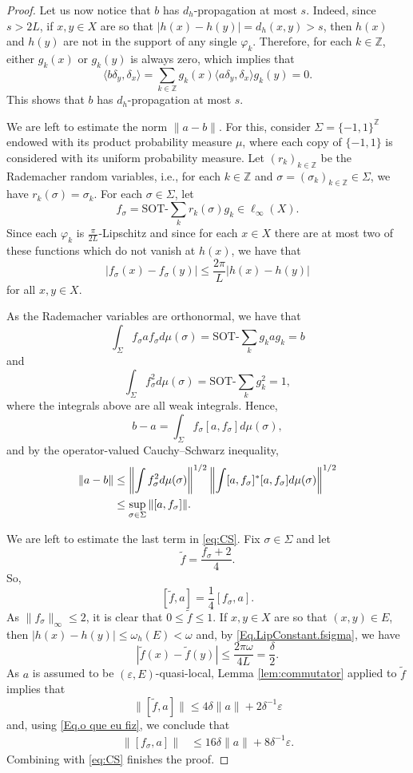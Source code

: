 \documentclass[11pt]{amsart}
\newcommand{\Z}{\mathbb{Z}}
\newcommand{\eps}{\varepsilon}
\newcommand{\SOTh}{\mathrm{SOT}\text{-}}
\numberwithin{equation}{section}
\theoremstyle{definition}
\theoremstyle{remark}
\begin{document}
\begin{proof}
Let us now notice that $b$  has $d_h$-propagation at most $s$. Indeed, since $s>2L$, if $x,y\in X$ are so that $|h(x)-h(y)|=d_h(x,y)> s$, then $h(x)$ and $h(y)$ are not in the support of any single $\varphi_k$.  Therefore, for each $k\in\Z$, either $g_k(x)$ or $g_k(y)$ is always zero, which implies that
\[\langle b\delta_y,\delta_x\rangle=\sum_{k\in\Z} g_k(x)\langle a\delta_y,\delta_x\rangle g_{k}(y)=0 .\]
This shows that $b$  has $d_h$-propagation at most $s$.


We are left to estimate the norm $\|a-b\|$. For this, consider $\Sigma=\{-1,1\}^{\Z}$ endowed with its  product probability measure $\mu$, where each copy of $\{-1,1\}$ is considered with its uniform probability measure.  Let $(r_k)_{k\in \Z}$ be the Rademacher random variables, i.e., for each $k\in\Z$ and $\sigma=(\sigma_k)_{k\in\Z}\in \Sigma$, we have  $r_k(\sigma)=\sigma_k$. For each $\sigma\in \Sigma$, let \[f_{\sigma}=\SOTh\sum_kr_k(\sigma)g_k\in\ell_\infty(X).\] Since each $\varphi_k$ is $\tfrac{\pi}{2L}$-Lipschitz and since for each $x\in X$ there are at most two of these functions which do not vanish at $h(x)$, we have that
\begin{equation}\label{Eq.LipConstant.fsigma}
|f_{\sigma}(x)-f_{\sigma}(y)|\le\frac{2\pi}{L}|h(x)-h(y)|
\end{equation}
for all $x,y\in X$.

As the Rademacher variables are orthonormal, we have that
\[\int_{\Sigma}f_\sigma af_\sigma d\mu(\sigma)=\SOTh\sum_kg_kag_k=b\]
and
\[\int_{\Sigma}f_\sigma^2d\mu(\sigma)=\SOTh\sum_kg_k^2=1,\]
where the integrals above are all weak integrals. Hence,
\[
b-a=\int_\Sigma f_{\sigma}[a,f_{\sigma}]d\mu(\sigma) ,
\]
and by the operator-valued Cauchy--Schwarz inequality,
\begin{align}\label{eq:CS}
\|a-b\|& \leq\left\|\int f_{\sigma}^2 d\mu(\sigma)\right\|^{1/2}\left\|\int[a,f_{\sigma}]^*[a,f_{\sigma}] d\mu(\sigma)\right\|^{1/2}\notag\\
&\le\sup_{\sigma\in\Sigma}\|[a,f_{\sigma}]\|.
\end{align}

We are left to  estimate the last term in \eqref{eq:CS}. Fix $\sigma\in \Sigma$ and let
\[\tilde f=\frac{f_{\sigma}+2}{4}.\]
So,
\begin{equation}\label{Eq.o que eu fiz}
[\tilde f,a]=\frac{1}{4}[f_\sigma,a].
\end{equation}
As $\|f_\sigma\|_\infty\leq 2$,  it is clear that  $0\le\tilde f\le 1$. If $x,y\in X$ are so that $(x,y)\in E$, then  $|h(x)-h(y)|\le\omega_h(E)<\omega$ and, by \eqref{Eq.LipConstant.fsigma}, we have
\[
|\tilde f(x)-\tilde f(y)|\le \frac{2\pi\omega}{4L}=\frac{\delta}{2} .
\]
As $a$ is assumed to be $(\eps,E)$-quasi-local, Lemma \ref{lem:commutator} applied to $\tilde f$ implies that  \[\|[\tilde f,a]\|\le4\delta\|a\|+2\delta^{-1}\varepsilon\] and, using \eqref{Eq.o que eu fiz}, we conclude that
\begin{align*}
\|[f_{\sigma},a]\|&\le 16\delta\|a\|+8\delta^{-1}\varepsilon.
\end{align*}
Combining with \eqref{eq:CS} finishes the proof.
\end{proof}
\end{document}
